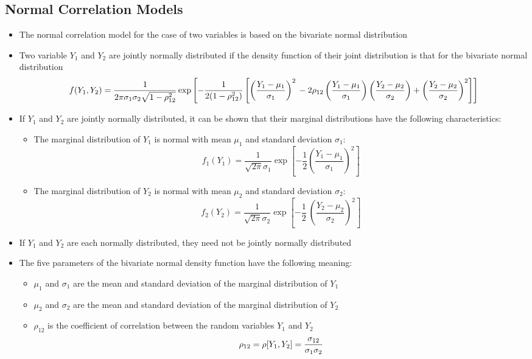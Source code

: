 \subsection{Normal Correlation Models}
\begin{itemize}
\item The normal correlation model for the case of two variables is based on the bivariate normal distribution
\item Two variable $Y_1$ and $Y_2$ are jointly normally distributed if the density function of their joint distribution is that for the bivariate normal distribution 
\begin{dmath*}  f(Y_1, Y_2) = \frac{1}{2\pi \sigma_1 \sigma_2 \sqrt{1 - \rho^2_{12}}} \exp \left[ -\frac{1}{2(1 - \rho^2_{12})} \left[ \left(\frac{Y_1 - \mu_1}{\sigma_1}\right)^2 \\ - 2\rho_{12}\left(\frac{Y_1 - \mu_1}{\sigma_1}\right)\left(\frac{Y_2 - \mu_2}{\sigma_2}\right) + \left(\frac{Y_2 - \mu_2}{\sigma_2}\right)^2 \right] \right]  \end{dmath*} 
\item If $Y_1$ and $Y_2$ are jointly normally distributed, it can be shown that their marginal distributions have the following characteristics: \begin{itemize}
\item The marginal distribution of $Y_1$ is normal with mean $\mu_1$ and standard deviation $\sigma_1$: $$ f_1(Y_1) = \frac{1}{\sqrt{2\pi} \sigma_1} \exp\left[ -\frac{1}{2} \left( \frac{Y_1 - \mu_1}{\sigma_1}\right)^2 \right] $$ 
\item The marginal distribution of $Y_2$ is normal with mean $\mu_2$ and standard deviation $\sigma_2$: $$ f_2(Y_2) = \frac{1}{\sqrt{2\pi} \sigma_2} \exp\left[ -\frac{1}{2}\ \left( \frac{Y_2 - \mu_2}{\sigma_2} \right)^2 \right] $$ \end{itemize}
\item If $Y_1$ and $Y_2$ are each normally distributed, they need not be jointly normally distributed 
\item The five parameters of the bivariate normal density function have the following meaning: \begin{itemize}
\item $\mu_1$ and $\sigma_1$ are the mean and standard deviation of the marginal distribution of $Y_1$
\item $\mu_2$ and $\sigma_2$ are the mean and standard deviation of the marginal distribution of $Y_2$
\item $\rho_{12}$ is the coefficient of correlation between the random variables $Y_1$ and $Y_2$ $$ \rho_{12} = \rho[Y_1, Y_2] = \frac{\sigma_{12}}{\sigma_1 \sigma_2} $$ 

\end{itemize}
\end{itemize}
